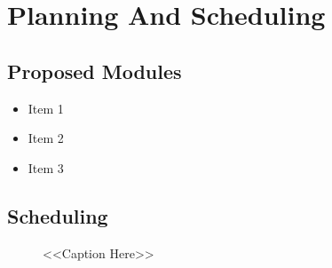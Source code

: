 \chapter{Planning And Scheduling}


\section{Proposed Modules}

\begin{itemize}
\item{Item 1}
\item{Item 2}
\item{Item 3}
\end{itemize}

\section{Scheduling}

\begin{figure}[H]
\centering
\caption{<<Caption Here>>}
\label{<<Label Here>>}
\end{figure}

